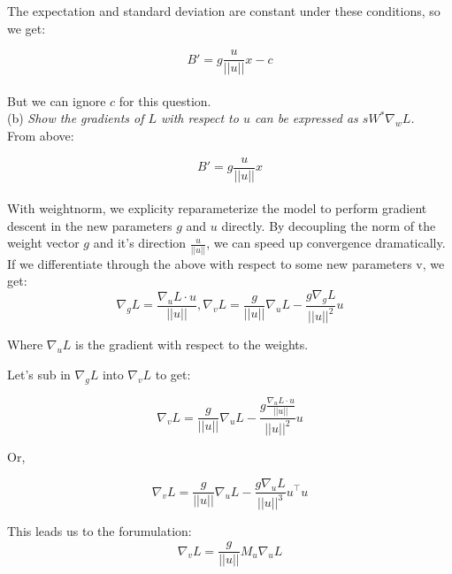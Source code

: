 \documentclass{amsart}
\theoremstyle{definition}
\theoremstyle{remark}
\numberwithin{equation}{section}
\begin{document}
The expectation and standard deviation are constant under these conditions, so
we get:

\begin{equation}
B' = g \frac{u}{||u||}x - c
\end{equation} \\

But we can ignore $c$ for this question. \\

(b) \textit{Show the gradients of $L$ with respect to $u$ can be expressed as
$sW^{*}\nabla_wL$.} \\

From above:

\begin{equation}
B' = g \frac{u}{||u||}x
\end{equation} \\

With weightnorm, we explicity reparameterize the model to perform gradient
descent in the new parameters $g$ and $u$ directly. By decoupling the norm of
the weight vector $g$ and it's direction $\frac{u}{||u||}$, we can speed up
convergence dramatically. \\

If we differentiate through the above with respect to some new parameters v,
we get: \\

\begin{equation}
\nabla_{g}L = \frac{\nabla_{u}L \cdot u}{||u||}, \nabla_{v}L = \frac{g}{||u||}\nabla_{u}L - \frac{g \nabla_{g}L}{||u||^{2}} u
\end{equation}

Where $\nabla_{u}L$ is the gradient with respect to the weights.

Let's sub in $\nabla_{g}L$ into $\nabla_{v}L$ to get:

\begin{equation}
\nabla_{v}L = \frac{g}{||u||}\nabla_{u}L -
    \frac{g \frac{\nabla_{u}L \cdot u}{||u||}}{||u||^{2}} u
\end{equation}

Or,

\begin{equation}
\nabla_{v}L = \frac{g}{||u||}\nabla_{u}L -
    \frac{g \nabla_{u}L}{||u||^{3}} u^\top u
\end{equation}

This leads us to the forumulation:\\

\begin{equation}
\nabla_{v}L = \frac{g}{||u||} M_{u} \nabla_{u}L
\end{equation}
\end{document}
